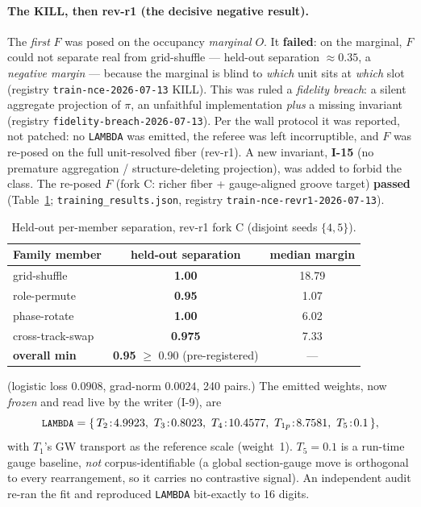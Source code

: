 \documentclass[11pt]{article}
\newcommand{\code}[1]{\texttt{\small #1}}
\begin{document}
\paragraph{The KILL, then rev-r1 (the decisive negative result).} The \emph{first}
$F$ was posed on the occupancy \emph{marginal} $O$. It \textbf{failed}: on the marginal, $F$ could
not separate real from grid-shuffle --- held-out separation $\approx 0.35$, a
\emph{negative margin} --- because the marginal is blind to \emph{which} unit sits
at \emph{which} slot (registry \code{train-nce-2026-07-13} KILL). This was ruled a
\emph{fidelity breach}: a silent aggregate projection of $\pi$, an unfaithful
implementation \emph{plus} a missing invariant (registry
\code{fidelity-breach-2026-07-13}). Per the wall protocol it was reported, not
patched: no \code{LAMBDA} was emitted, the referee was left incorruptible, and $F$
was re-posed on the full unit-resolved fiber (rev-r1). A new invariant, \textbf{I-15}
(no premature aggregation / structure-deleting projection), was added to forbid the
class. The re-posed $F$ (fork C: richer fiber + gauge-aligned groove target)
\textbf{passed} (Table~\ref{tab:sep}; \code{training\_results.json}, registry
\code{train-nce-revr1-2026-07-13}).

\begin{table}[htbp]
\centering
\caption{Held-out per-member separation, rev-r1 fork C (disjoint seeds $\{4,5\}$).}
\label{tab:sep}
\small
\begin{tabular}{@{}l c c@{}}
\toprule
Family member & held-out separation & median margin \\
\midrule
grid-shuffle      & \textbf{1.00}  & 18.79 \\
role-permute      & \textbf{0.95}  & 1.07 \\
phase-rotate      & \textbf{1.00}  & 6.02 \\
cross-track-swap  & \textbf{0.975} & 7.33 \\
\midrule
\textbf{overall min} & \textbf{0.95} $\ge$ 0.90 (pre-registered) & --- \\
\bottomrule
\end{tabular}
\end{table}

(logistic loss $0.0908$, grad-norm $0.0024$, 240 pairs.) The emitted weights, now
\emph{frozen} and read live by the writer (I-9), are
\[
  \code{LAMBDA} = \{\,T_2\!:\!4.9923,\ T_3\!:\!0.8023,\ T_4\!:\!10.4577,\
  T_{1p}\!:\!8.7581,\ T_5\!:\!0.1\,\},
\]
with $T_1$'s GW transport as the reference scale (weight~1). $T_5=0.1$ is a
run-time gauge baseline, \emph{not} corpus-identifiable (a global section-gauge
move is orthogonal to every rearrangement, so it carries no contrastive signal).
An independent audit re-ran the fit and reproduced \code{LAMBDA} bit-exactly to 16
digits.
\end{document}
